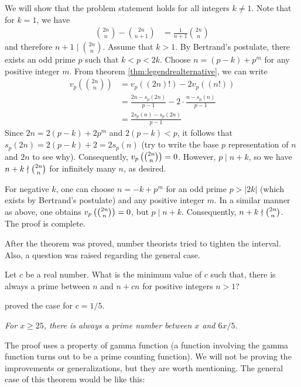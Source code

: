 \documentclass{subfile}
\begin{document}
	\begin{solution}
		We will show that the problem statement holds for all integers $k \neq 1$. Note that for $k=1$, we have
			\begin{align*}
				\binom{2n}{n} - \binom{2n}{n+1}
					& = \frac{1}{n+1}\binom{2n}{n}
			\end{align*}
		and therefore $n+1\mid \binom{2n}{n}$. Assume that $k>1$. By Bertrand's postulate, there exists an odd prime $p$ such that $k<p<2k$. Choose $n=(p-k)+p^m$ for any positive integer $m$. From theorem \autoref{thm:legendrealternative}, we can write
			\begin{align*}
				v_p \left(\binom{2n}n\right)  &=  v_p((2n)!) - 2v_p((n!))\\
				&=  \frac{2n - s_p(2n)}{p-1} - 2 \cdot \frac{n - s_p(n)}{p-1}\\
				&=   \frac{2s_p(n) - s_p(2n)}{p - 1}
			\end{align*}
		Since $2n = 2(p - k) + 2p^m$ and $2(p - k) < p$, it follows that $s_p(2n) = 2(p - k) + 2 = 2s_p(n)$ (try to write the base $p$ representation of $n$ and $2n$ to see why). Consequently, $v_p\left(\tbinom{2n}{n}\right) = 0$. However, $p \mid n + k$, so we have $n + k \nmid \tbinom{2n}{n}$ for infinitely many $n$, as desired.

		For negative $k$, one can choose $n = -k + p^m$ for an odd prime $p > |2k|$ (which exists by Bertrand's postulate) and any positive integer $m$. In a similar manner as above, one obtains $v_p\left(\tbinom{2n}{n}\right) = 0$, but $p \mid n + k$. Consequently, $n + k \nmid \tbinom{2n}{n}$. The proof is complete.
	\end{solution}
After the theorem was proved, number theorists tried to tighten the interval. Also, a question was raised regarding the general case.
	\begin{problem}
		Let $c$ be a real number. What is the minimum value of $c$ such that, there is always a prime between $n$ and $n+cn$ for positive integers $n>1$?
	\end{problem}
\textcite{nagura_1952} proved the case for $c=1/5$.
	\begin{theorem}[Nagura]\slshape
		For $x\geq25$, there is always a prime number between $x$ and $6x/5$.
	\end{theorem}
The proof uses a property of gamma function (a function involving the gamma function turns out to be a prime counting function). We will not be proving the improvements or generalizations, but they are worth mentioning. The general case of this theorem would be like this:
\end{document}

